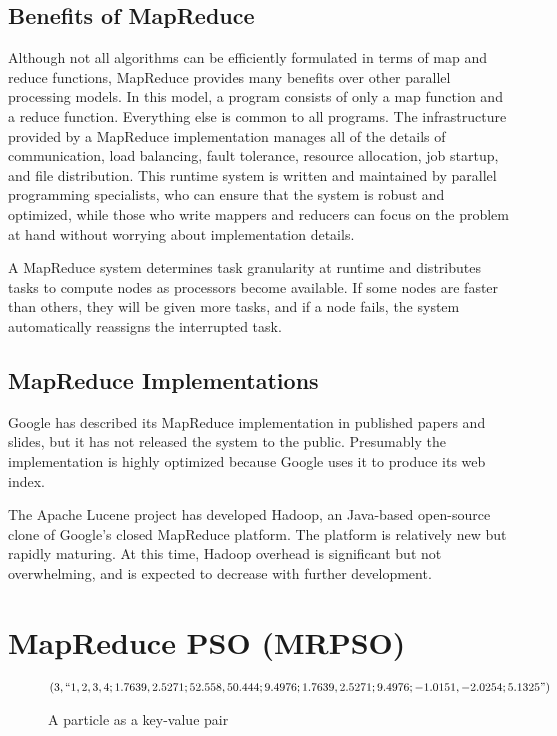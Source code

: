 \documentclass[letterpaper]{sig-alternate}
\begin{document}
\subsection{Benefits of MapReduce}

Although not all algorithms can be efficiently formulated in terms of map and
reduce functions, MapReduce provides many benefits over other parallel
processing models.  In this model, a program consists of only a map function
and a reduce function.  Everything else is common to all programs.  The
infrastructure provided by a MapReduce implementation manages all of the
details of communication, load balancing, fault tolerance, resource
allocation, job startup, and file distribution.  This runtime system is
written and maintained by parallel programming specialists, who can ensure
that the system is robust and optimized, while those who write mappers and
reducers can focus on the problem at hand without worrying about
implementation details.

A MapReduce system determines task granularity at runtime and
distributes tasks to compute nodes as processors become available.  If some
nodes are faster than others, they will be given more tasks, and if a node
fails, the system automatically reassigns the interrupted task.

\subsection{MapReduce Implementations}

Google has described its MapReduce implementation in published papers and
slides, but it has not released the system to the public.  Presumably the
implementation is highly optimized because Google uses it to produce its web
index.

The Apache Lucene project has developed Hadoop, an Java-based open-source
clone of Google's closed MapReduce platform.  The platform is relatively new
but rapidly maturing.  At this time, Hadoop overhead is significant but not
overwhelming, and is expected to decrease with further development.


\section{MapReduce PSO (MRPSO)}
\label{sec:mrpso}

\begin{figure*}
\begin{align*}
(3, ``1,2,3,4;1.7639,2.5271;52.558,50.444;9.4976;1.7639,2.5271;9.4976;-1.0151,-2.0254;5.1325")
\end{align*}
\caption{A particle as a key-value pair}
\label{fig:sample-particle}
\end{figure*}
\end{document}
